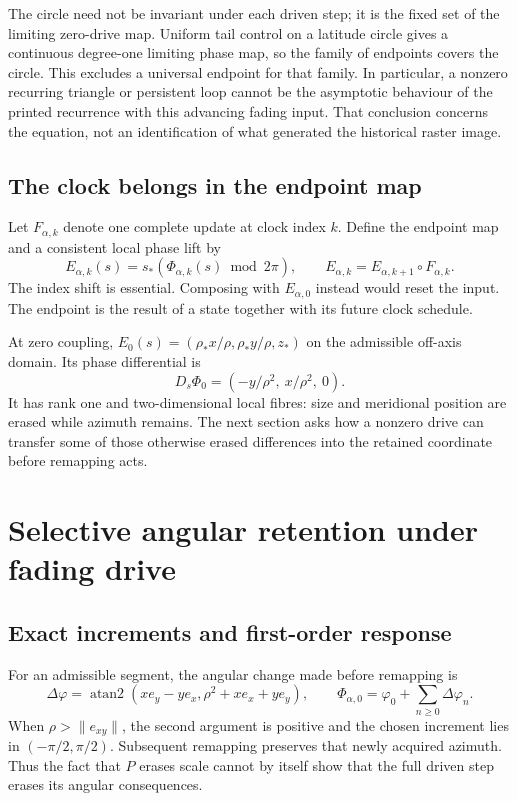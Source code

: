 \documentclass[11pt,a4paper]{article}
\numberwithin{equation}{section}
\newcommand{\atanTwo}{\operatorname{atan2}}
\begin{document}
The circle need not be invariant under each driven step; it is the fixed set of the limiting zero-drive map. Uniform tail control on a latitude circle gives a continuous degree-one limiting phase map, so the family of endpoints covers the circle. This excludes a universal endpoint for that family. In particular, a nonzero recurring triangle or persistent loop cannot be the asymptotic behaviour of the printed recurrence with this advancing fading input. That conclusion concerns the equation, not an identification of what generated the historical raster image.

\subsection{The clock belongs in the endpoint map}
Let $F_{\alpha,k}$ denote one complete update at clock index $k$. Define the endpoint map and a consistent local phase lift by
\begin{equation}\label{eq:endpoint}
E_{\alpha,k}(s)=s_*(\Phi_{\alpha,k}(s)\bmod 2\pi),\qquad
E_{\alpha,k}=E_{\alpha,k+1}\circ F_{\alpha,k}.
\end{equation}
The index shift is essential. Composing with $E_{\alpha,0}$ instead would reset the input. The endpoint is the result of a state together with its future clock schedule.

At zero coupling, $E_0(s)=(\rho_*x/\rho,\rho_*y/\rho,z_*)$ on the admissible off-axis domain. Its phase differential is
\begin{equation}\label{eq:zerophase}
D_s\Phi_0=(-y/\rho^2,\ x/\rho^2,\ 0).
\end{equation}
It has rank one and two-dimensional local fibres: size and meridional position are erased while azimuth remains. The next section asks how a nonzero drive can transfer some of those otherwise erased differences into the retained coordinate before remapping acts.

\section{Selective angular retention under fading drive}\label{sec:retention}
\subsection{Exact increments and first-order response}
For an admissible segment, the angular change made before remapping is
\begin{equation}\label{eq:phaseincrement}
\Delta\varphi=\atanTwo(xe_y-ye_x,\rho^2+xe_x+ye_y),\qquad
\Phi_{\alpha,0}=\varphi_0+\sum_{n\ge0}\Delta\varphi_n.
\end{equation}
When $\rho>\|e_{xy}\|$, the second argument is positive and the chosen increment lies in $(-\pi/2,\pi/2)$. Subsequent remapping preserves that newly acquired azimuth. Thus the fact that $P$ erases scale cannot by itself show that the full driven step erases its angular consequences.
\end{document}
